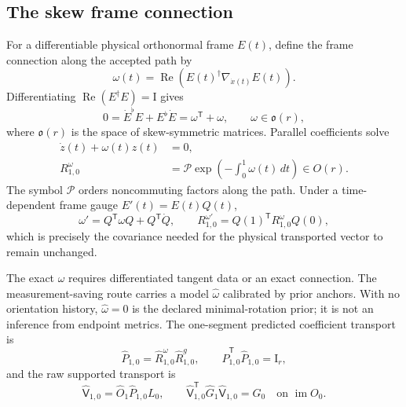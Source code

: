 \documentclass[10pt,twocolumn]{article}
\theoremstyle{definition}
\theoremstyle{remark}
\newcommand{\Id}{\mathrm I}
\newcommand{\Rea}{\operatorname{Re}}
\newcommand{\im}{\operatorname{im}}
\begin{document}
\subsection{The skew frame connection}

For a differentiable physical orthonormal frame $E(t)$, define the frame connection along the accepted path by
\begin{equation}
 \omega(t)=\Rea\!\left(E(t)^\dagger\nabla_{\dot x(t)}E(t)\right).
 \label{eq:spinconnection}
\end{equation}
Differentiating $\Rea(E^\dagger E)=\Id$ gives
\begin{equation}
 0=\dot E^\flat E+E^\flat\dot E=\omega^{\mathsf T}+\omega,\qquad \omega\in\mathfrak o(r),
 \label{eq:omegaskew}
\end{equation}
where $\mathfrak o(r)$ is the space of skew-symmetric matrices.  Parallel coefficients solve
\begin{align}
 \dot z(t)+\omega(t)z(t)&=0,\nonumber\\
 R^\omega_{1,0}
 &=\mathcal P\exp\!\left(-\int_0^1\omega(t)\,dt\right)\in O(r).
 \label{eq:pathordered}
\end{align}
The symbol $\mathcal P$ orders noncommuting factors along the path.  Under a time-dependent frame gauge $E'(t)=E(t)Q(t)$,
\begin{equation}
 \omega'=Q^{\mathsf T}\omega Q+Q^{\mathsf T}\dot Q,\qquad
 R^{\omega'}_{1,0}=Q(1)^{\mathsf T}R^\omega_{1,0}Q(0),
 \label{eq:gaugeconnection}
\end{equation}
which is precisely the covariance needed for the physical transported vector to remain unchanged.

The exact $\omega$ requires differentiated tangent data or an exact connection.  The measurement-saving route carries a model $\widehat\omega$ calibrated by prior anchors.  With no orientation history, $\widehat\omega=0$ is the declared minimal-rotation prior; it is not an inference from endpoint metrics.  The one-segment predicted coefficient transport is
\begin{equation}
 \widehat P_{1,0}=\widehat R^\omega_{1,0}\widehat R^g_{1,0},\qquad
 \widehat P_{1,0}^{\mathsf T}\widehat P_{1,0}=\Id_r,
 \label{eq:splittransport}
\end{equation}
and the raw supported transport is
\begin{equation}
 \widehat{\mathsf V}_{1,0}=\widehat O_1\widehat P_{1,0}L_0,\qquad
 \widehat{\mathsf V}_{1,0}^{\mathsf T}\widehat G_1\widehat{\mathsf V}_{1,0}=G_0
 \quad\text{on }\im O_0.
 \label{eq:rawtransport}
\end{equation}
\end{document}
